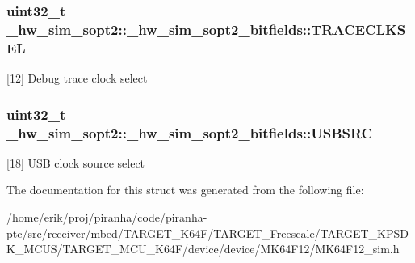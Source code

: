 \subsubsection[{\texorpdfstring{T\+R\+A\+C\+E\+C\+L\+K\+S\+EL}{TRACECLKSEL}}]{\setlength{\rightskip}{0pt plus 5cm}uint32\+\_\+t \+\_\+hw\+\_\+sim\+\_\+sopt2\+::\+\_\+hw\+\_\+sim\+\_\+sopt2\+\_\+bitfields\+::\+T\+R\+A\+C\+E\+C\+L\+K\+S\+EL}\hypertarget{struct__hw__sim__sopt2_1_1__hw__sim__sopt2__bitfields_afcebf172c8cd967b4d0d3f3e06ca1d93}{}\label{struct__hw__sim__sopt2_1_1__hw__sim__sopt2__bitfields_afcebf172c8cd967b4d0d3f3e06ca1d93}
\mbox{[}12\mbox{]} Debug trace clock select 
\subsubsection[{\texorpdfstring{U\+S\+B\+S\+RC}{USBSRC}}]{\setlength{\rightskip}{0pt plus 5cm}uint32\+\_\+t \+\_\+hw\+\_\+sim\+\_\+sopt2\+::\+\_\+hw\+\_\+sim\+\_\+sopt2\+\_\+bitfields\+::\+U\+S\+B\+S\+RC}\hypertarget{struct__hw__sim__sopt2_1_1__hw__sim__sopt2__bitfields_ac70a3aa02a74b70417dcbd3eb04f002f}{}\label{struct__hw__sim__sopt2_1_1__hw__sim__sopt2__bitfields_ac70a3aa02a74b70417dcbd3eb04f002f}
\mbox{[}18\mbox{]} U\+SB clock source select 

The documentation for this struct was generated from the following file\+:\begin{DoxyCompactItemize}
\item 
/home/erik/proj/piranha/code/piranha-\/ptc/src/receiver/mbed/\+T\+A\+R\+G\+E\+T\+\_\+\+K64\+F/\+T\+A\+R\+G\+E\+T\+\_\+\+Freescale/\+T\+A\+R\+G\+E\+T\+\_\+\+K\+P\+S\+D\+K\+\_\+\+M\+C\+U\+S/\+T\+A\+R\+G\+E\+T\+\_\+\+M\+C\+U\+\_\+\+K64\+F/device/device/\+M\+K64\+F12/M\+K64\+F12\+\_\+sim.\+h\end{DoxyCompactItemize}
